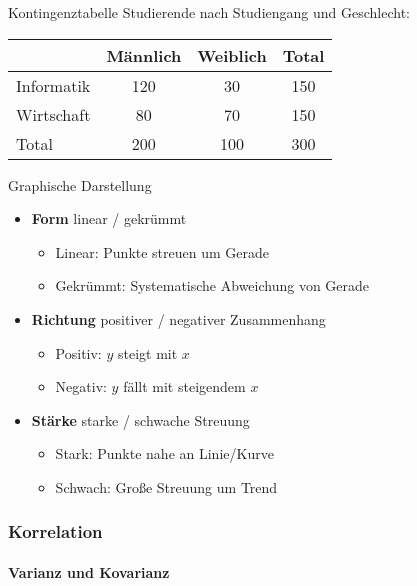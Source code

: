 \begin{example2}{Kontingenztabelle}
Studierende nach Studiengang und Geschlecht:
\begin{center}
\begin{tabular}{|l|c|c|c|}
\hline
 & Männlich & Weiblich & Total \\
\hline
Informatik & 120 & 30 & 150 \\
Wirtschaft & 80 & 70 & 150 \\
\hline
Total & 200 & 100 & 300 \\
\hline
\end{tabular}
\end{center}
\end{example2}

\begin{concept}{Graphische Darstellung}
\begin{itemize}
 \item \textbf{Form} \hspace{1.5cm} linear / gekrümmt
    \begin{itemize}
        \item Linear: Punkte streuen um Gerade
        \item Gekrümmt: Systematische Abweichung von Gerade
    \end{itemize}
 \item \textbf{Richtung} \hspace{0.85cm} positiver / negativer Zusammenhang
    \begin{itemize}
        \item Positiv: $y$ steigt mit $x$
        \item Negativ: $y$ fällt mit steigendem $x$
    \end{itemize}
 \item \textbf{Stärke} \hspace{1.2cm} starke / schwache Streuung
    \begin{itemize}
        \item Stark: Punkte nahe an Linie/Kurve
        \item Schwach: Große Streuung um Trend
    \end{itemize}
\end{itemize}
\end{concept}

\subsubsection{Korrelation}

\paragraph{Varianz und Kovarianz}

